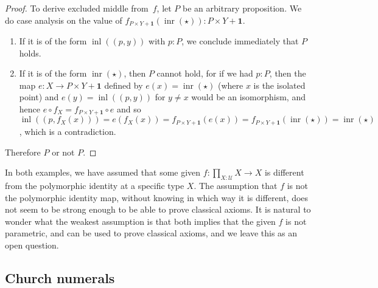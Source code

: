 \documentclass[a4paper,UKenglish]{lipics-v2016}
\newcommand{\comp}{\mathrel{\circ}}
\newcommand{\UU}{\mathcal{U}}
\newcommand{\ttt}{\star}
\newcommand{\unit}{\mathbf{1}}
\newcommand{\inl}{{\operatorname{inl}}}
\newcommand{\inr}{{\operatorname{inr}}}
\begin{document}
\begin{proof}
  To derive excluded middle from~$f$, let $P$ be an arbitrary
  proposition. We do case analysis on the value of
  $f_{P\times Y + \unit}(\inr(\ttt)) : P \times Y + \unit$.
  \begin{enumerate}
  \item If it is of the form $\inl((p,y))$ with $p:P$, we conclude
    immediately that $P$ holds.
  \item If it is of the form $\inr(\ttt)$, then $P$ cannot hold, for
    if we had $p:P$, then the map $e : X \to P\times Y + \unit$
    defined by $e(x)=\inr(\ttt)$ (where $x$ is the isolated point) and
    $e(y)=\inl((p,y))$ for $y \neq x$ would be an isomorphism, and
    hence $e \comp f_X = f_{P\times Y+\unit} \comp e$ and so
    $ \inl((p,f_X(x))) = e (f_X(x)) = f_{P\times Y+\unit} (e(x)) =
    f_{P\times Y+\unit} (\inr(\ttt)) =\inr(\ttt)$, which is a contradiction.
  \end{enumerate}
Therefore $P$ or not $P$.
%
%
\end{proof}

In both examples, we have assumed that some given
$f:\prod_{X : \UU} X \to X$ is different from the polymorphic identity
at a specific type $X$.  The assumption that $f$ is not the
polymorphic identity map, without knowing in which way it is
different, does not seem to be strong enough to be able to prove
classical axioms.  It is natural to wonder what the weakest assumption
is that both implies that the given $f$ is not parametric, and can be
used to prove classical axioms, and we leave this as an open question.

\subsection{Church numerals}
\end{document}
